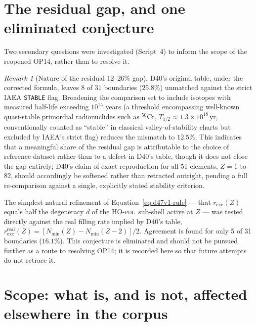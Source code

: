 \documentclass[12pt,a4paper]{article}
\theoremstyle{plain}
\theoremstyle{definition}
\theoremstyle{remark}
\newtheorem{remark}[theorem]{Remark}
\newenvironment{negativebox}[1][]{%
\begin{tcolorbox}[negativestyle,title={Negative Result\ifx\relax#1\relax\else: #1\fi}]}{\end{tcolorbox}}
\newcommand{\PDL}{\textsc{pdl}}
\newcommand{\Nmin}{N_{\min}}
\newcommand{\rexc}{r_{\mathrm{exc}}}
\begin{document}
\section{The residual gap, and one eliminated conjecture}
\label{sec:residual}

Two secondary questions were investigated (Script~4) to inform the scope of the reopened OP14, rather than to resolve it.

\begin{remark}[Nature of the residual 12--26\% gap]
D40's original table, under the corrected formula, leaves $8$ of $31$ boundaries ($25.8\%$) unmatched against the strict IAEA \texttt{STABLE} flag. Broadening the comparison set to include isotopes with measured half-life exceeding $10^{15}$ years (a threshold encompassing well-known quasi-stable primordial radionuclides such as $^{50}$Cr, $T_{1/2}\approx1.3\times10^{18}$\,yr, conventionally counted as ``stable'' in classical valley-of-stability charts but excluded by IAEA's strict flag) reduces the mismatch to $12.5\%$. This indicates that a meaningful share of the residual gap is attributable to the choice of reference dataset rather than to a defect in D40's table, though it does not close the gap entirely; D40's claim of exact reproduction for all 51 elements, $Z=1$ to $82$, should accordingly be softened rather than retracted outright, pending a full re-comparison against a single, explicitly stated stability criterion.
\end{remark}

\begin{negativebox}[Conjecture $H_{d/2}$ eliminated]
\label{neg:hd2}
The simplest natural refinement of Equation~\eqref{eq:d47v1-rule} --- that $\rexc(Z)$ equals half the degeneracy $d$ of the HO-\PDL\ sub-shell active at $Z$ --- was tested directly against the real filling rate implied by D40's table, $\rexc^{\mathrm{real}}(Z)=[\Nmin(Z)-\Nmin(Z-2)]/2$. Agreement is found for only 5 of 31 boundaries ($16.1\%$). This conjecture is eliminated and should not be pursued further as a route to resolving OP14; it is recorded here so that future attempts do not retrace it.
\end{negativebox}

\section{Scope: what is, and is not, affected elsewhere in the corpus}
\label{sec:scope}
\end{document}
